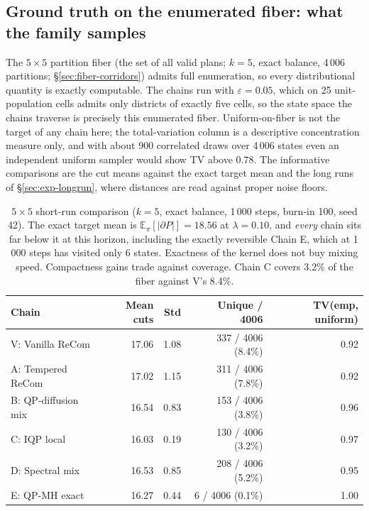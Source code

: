 \documentclass[11pt]{article}
\newcommand{\E}{\mathbb{E}}
\begin{document}
\subsection{Ground truth on the enumerated fiber: what the family samples}\label{sec:exp-5x5}

The $5 \times 5$ partition fiber (the set of all valid plans; $k = 5$, exact balance, 4\,006
partitions; \S\ref{sec:fiber-corridors}) admits full enumeration, so
every distributional quantity is exactly computable. The chains run
with $\varepsilon = 0.05$, which on 25 unit-population cells admits
only districts of exactly five cells, so the state space the chains
traverse is precisely this enumerated fiber. Uniform-on-fiber is not the target of any chain here; the
total-variation column is a descriptive concentration measure only,
and with about 900 correlated draws over 4\,006 states even an
independent uniform sampler would show TV above $0.78$. The
informative comparisons are the cut means against the exact target
mean and the long runs of \S\ref{sec:exp-longrun}, where distances
are read against proper noise floors.

\begin{table}[H]
\centering
\small
\begin{tabular}{lrrrr}
\toprule
Chain & Mean cuts & Std & Unique / 4006 & TV(emp, uniform) \\
\midrule
V: Vanilla ReCom     & 17.06 & 1.08 & 337 / 4006 (8.4\%) & 0.92 \\
A: Tempered ReCom    & 17.02 & 1.15 & 311 / 4006 (7.8\%) & 0.92 \\
B: QP-diffusion mix  & 16.54 & 0.83 & 153 / 4006 (3.8\%) & 0.96 \\
C: IQP local         & 16.03 & 0.19 & 130 / 4006 (3.2\%) & 0.97 \\
D: Spectral mix      & 16.53 & 0.85 & 208 / 4006 (5.2\%) & 0.95 \\
E: QP-MH exact       & 16.27 & 0.44 & \phantom{00}6 / 4006 (0.1\%) & 1.00 \\
\bottomrule
\end{tabular}
\caption{$5 \times 5$ short-run comparison ($k = 5$, exact balance,
  1\,000 steps, burn-in 100, seed 42). The exact target mean is
  $\E_\pi[|\partial P|] = 18.56$ at $\lambda = 0.10$, and \emph{every}
  chain sits far below it at this horizon, including the exactly
  reversible Chain E, which at 1\,000 steps has visited only 6 states. Exactness of the kernel does not buy mixing speed. Compactness
  gains trade against coverage. Chain C covers 3.2\% of the fiber against
  V's 8.4\%.}\label{tab:5x5-headline}
\end{table}
\end{document}
